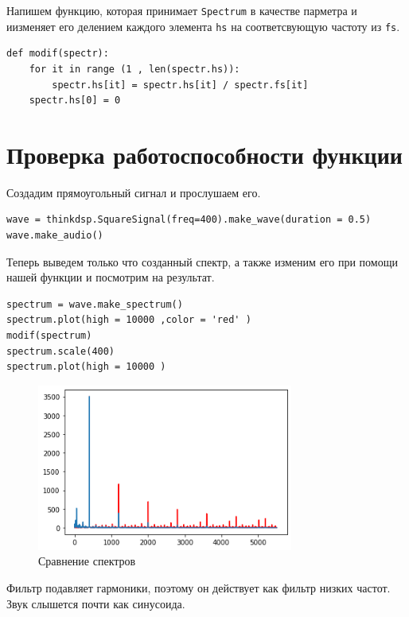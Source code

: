 \documentclass[a4paper,12pt]{report}
\begin{document}
Напишем функцию, которая принимает \texttt{Spectrum} в качестве парметра и иизменяет его делением каждого элемента \texttt{hs} на соответсвующую частоту из \texttt{fs}.

\begin{lstlisting}[caption=Создание функции]
def modif(spectr):
    for it in range (1 , len(spectr.hs)):
        spectr.hs[it] = spectr.hs[it] / spectr.fs[it]
    spectr.hs[0] = 0
\end{lstlisting}

\section{Проверка работоспособности функции}

Создадим прямоугольный сигнал и прослушаем его.

\begin{lstlisting}[caption=Создание сигнала и его воспроизведение]
wave = thinkdsp.SquareSignal(freq=400).make_wave(duration = 0.5)
wave.make_audio()
\end{lstlisting}

Теперь выведем только что созданный спектр, а также изменим его при помощи нашей функции и посмотрим на результат.

\begin{lstlisting}[caption=Сравнение спектров]
spectrum = wave.make_spectrum()
spectrum.plot(high = 10000 ,color = 'red' )
modif(spectrum)
spectrum.scale(400)
spectrum.plot(high = 10000 )
\end{lstlisting}

\begin{figure}[H]
        \centering
        \includegraphics[width=0.75\textwidth]{6.png}
        \caption{Сравнение спектров}
        \label{fig:fig5_1}
\end{figure}

Фильтр подавляет гармоники, поэтому он действует как фильтр низких частот. Звук слышется почти как синусоида.
\end{document}

